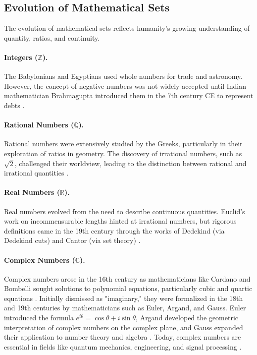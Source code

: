\subsection{Evolution of Mathematical Sets}

The evolution of mathematical sets reflects humanity's growing understanding of quantity, ratios, and continuity.

\paragraph{Integers (\( \mathbb{Z} \)).}
The Babylonians and Egyptians used whole numbers for trade and astronomy. However, the concept of negative numbers was not widely accepted until Indian mathematician Brahmagupta introduced them in the 7th century CE to represent debts \cite{burton2010-number}. 

\paragraph{Rational Numbers (\( \mathbb{Q} \)).}
Rational numbers were extensively studied by the Greeks, particularly in their exploration of ratios in geometry. The discovery of irrational numbers, such as \( \sqrt{2} \), challenged their worldview, leading to the distinction between rational and irrational quantities \cite{maor2007}.

\paragraph{Real Numbers (\( \mathbb{R} \)).}
Real numbers evolved from the need to describe continuous quantities. Euclid's work on incommensurable lengths hinted at irrational numbers, but rigorous definitions came in the 19th century through the works of Dedekind (via Dedekind cuts) and Cantor (via set theory) \cite{rosen2018}.

\paragraph{Complex Numbers (\( \mathbb{C} \)).}
Complex numbers arose in the 16th century as mathematicians like Cardano and Bombelli sought solutions to polynomial equations, particularly cubic and quartic equations \cite{boyer1991history}. Initially dismissed as "imaginary," they were formalized in the 18th and 19th centuries by mathematicians such as Euler, Argand, and Gauss. Euler introduced the formula \( e^{i\theta} = \cos\theta + i\sin\theta \), Argand developed the geometric interpretation of complex numbers on the complex plane, and Gauss expanded their application to number theory and algebra \cite{kline1990mathematics, stewart2015-foundations}. Today, complex numbers are essential in fields like quantum mechanics, engineering, and signal processing \cite{maor2007}.


